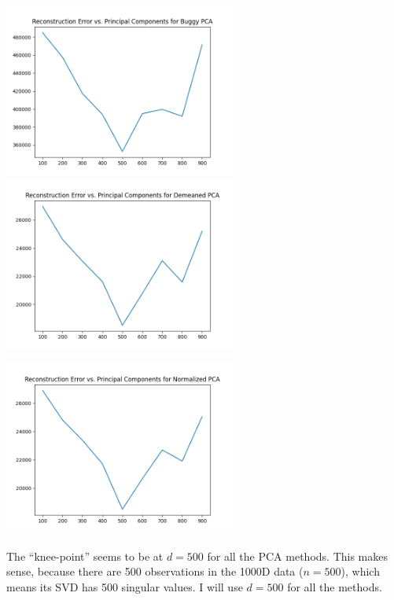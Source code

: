 \begin{itemize}
\begin{soln}
  \includegraphics[width=3in]{../figs/buggy_error_curve.png} \hspace{0.1in}
  \includegraphics[width=3in]{../figs/demeaned_error_curve.png} \\
  \begin{center}
    \includegraphics[width=3in]{../figs/normalized_error_curve.png}
  \end{center} 

  The ``knee-point'' seems to be at $d = 500$ for all the PCA methods.
  This makes sense, because there are 500 observations in the 1000D data ($n=500$), which means its SVD has 500 singular values.
  I will use $d=500$ for all the methods.


\end{soln}
\end{itemize}
